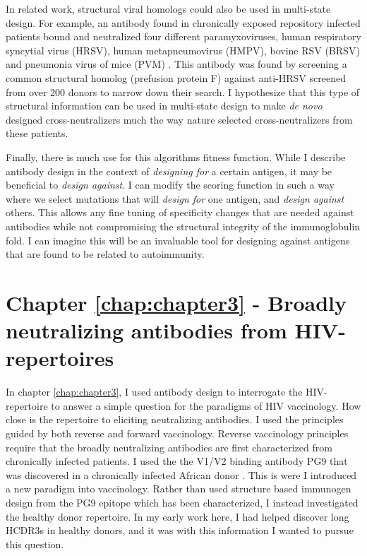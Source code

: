 In related work, structural viral homologs could also be used in multi-state design. For example, an antibody found in chronically exposed repository infected patients bound and neutralized four different paramyxoviruses, human respiratory syncytial virus (HRSV), human metapneumovirus (HMPV), bovine RSV (BRSV) and pneumonia virus of mice (PVM) \citep{Corti:2013cv}. This antibody was found by screening a common structural homolog (prefusion protein F) against anti-HRSV screened from over 200 donors to narrow down their search. I hypothesize that this type of structural information can be used in multi-state design to make \textit{de novo} designed cross-neutralizers much the way nature selected cross-neutralizers from these patients.

Finally, there is much use for this algorithms fitness function. While I describe antibody design in the context of \textit{designing for} a certain antigen, it may be beneficial to \textit{design against}. I can modify the scoring function in such a way where we select mutations that will \textit{design for} one antigen, and \textit{design against} others. This allows any fine tuning of specificity changes that are needed against antibodies while not compromising the structural integrity of the immunoglobulin fold. I can imagine this will be an invaluable tool for designing against antigens that are found to be related to autoimmunity.

\section{Chapter \ref{chap:chapter3} - Broadly neutralizing antibodies from HIV-\naive repertoires}
In chapter \ref{chap:chapter3}, I used antibody design to interrogate the HIV-\naive repertoire to answer a simple question for the paradigms of HIV vaccinology. How close is the \naive repertoire to eliciting neutralizing antibodies. I used the principles guided by both reverse  and forward vaccinology\citep{Burton:2012bh}. Reverse vaccinology principles require that the broadly neutralizing antibodies are first characterized from chronically infected patients. I used the the V1/V2 binding antibody PG9 that was discovered in a chronically infected African donor \citep{McLellan:2011dg,Walker:2009cd}. This is were I introduced a new paradigm into vaccinology. Rather than used structure based immunogen design from the PG9 epitope which has been characterized, I instead investigated the healthy donor repertoire. In my early work here, I had helped discover long HCDR3s in healthy donors, and it was with this information I wanted to pursue this question.

